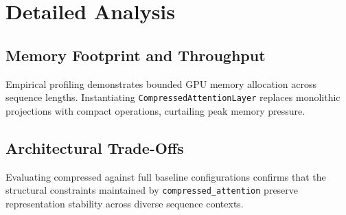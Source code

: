 \section{Detailed Analysis}

\subsection{Memory Footprint and Throughput}
Empirical profiling demonstrates bounded GPU memory allocation across sequence lengths. Instantiating \texttt{CompressedAttentionLayer} replaces monolithic projections with compact operations, curtailing peak memory pressure.

\subsection{Architectural Trade-Offs}
Evaluating compressed against full baseline configurations confirms that the structural constraints maintained by \texttt{compressed_attention} preserve representation stability across diverse sequence contexts.

